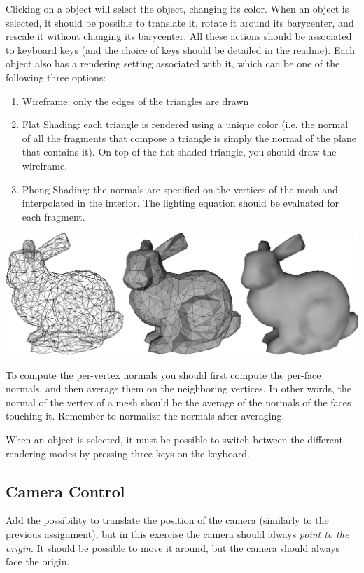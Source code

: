 \documentclass[11pt]{article}
\begin{document}
Clicking on a object will select the object, changing its color. When an object is selected, it should be possible to translate it, rotate it around its barycenter, and rescale it without changing its barycenter. All these actions should be associated to keyboard keys (and the choice of keys should be detailed in the readme).
%
Each object also has a rendering setting associated with it, which can be one of the following three options:
\begin{enumerate}
	\item Wireframe: only the edges of the triangles are drawn
	\item Flat Shading: each triangle is rendered using a unique color (i.e. the normal of all the fragments that compose a triangle is simply the normal of the plane that contains it). On top of the flat shaded triangle, you should draw the wireframe.
	\item Phong Shading: the normals are specified on the vertices of the mesh and interpolated in the interior. The lighting equation should be evaluated for each fragment.
\end{enumerate}

\includegraphics[width=1\textwidth]{bunny}
    
To compute the per-vertex normals you should first compute the per-face normals, and then average them on the neighboring vertices. In other words, the normal of the vertex of a mesh should be the average of the normals of the faces touching it. Remember to normalize the normals after averaging.

When an object is selected, it must be possible to switch between the different rendering modes by pressing three keys on the keyboard.

\subsection{Camera Control}

Add the possibility to translate the position of the camera (similarly to the previous assignment), but in this exercise the camera should always \emph{point to the origin}. It should be possible to move it around, but the camera should always face the origin.
\end{document}
